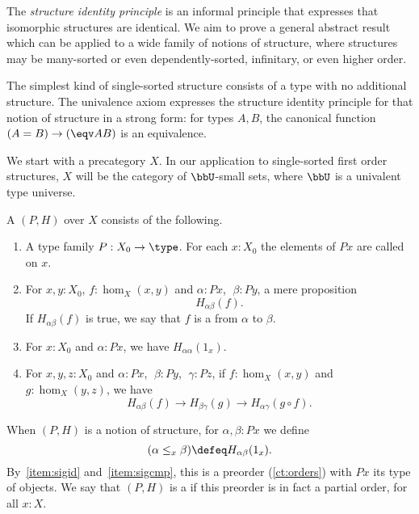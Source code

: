 The \emph{structure identity principle} is an informal principle
that expresses that isomorphic structures are identical.  We aim to
prove a general abstract result which can be applied to a wide family
of notions of structure, where structures may be many-sorted or even
dependently-sorted, infinitary, or even higher order.

The simplest kind of single-sorted structure consists of a type with
no additional structure.  The univalence axiom expresses the structure identity principle for that
notion of structure in a strong form: for types $A,B$, the
canonical function $(A=B)\to (\eqv A B)$ is an equivalence.

We start with a precategory $X$.  In our application to
single-sorted first order structures, $X$ will be the category %
of $\bbU$-small sets, where $\bbU$ is a univalent type universe.

\begin{defn}\label{ct:sig}
  A 
  $(P,H)$ over $X$ consists of the following.
  \begin{enumerate}
  \item A type family $P:X_0 \to \type$.
    For each $x:X_0$ the elements of $Px$ are called 
    on $x$.
  \item For $x,y:X_0$, $f:\hom_X(x,y)$ and $\alpha:Px$, $\;\beta:Py$, a mere proposition
  \[ H_{\alpha\beta}(f).\]
    If $H_{\alpha\beta}(f)$ is true, we say that $f$ is a 
    from $\alpha$ to $\beta$.
  \item For $x:X_0$ and $\alpha:Px$, we have $H_{\alpha\alpha}(1_x)$.\label{item:sigid}
  \item For $x,y,z:X_0$ and $\alpha:Px$, $\;\beta:Py$, $\;\gamma:Pz$,
if $f:\hom_X(x,y)$ and $g:\hom_X(y,z)$, we have\label{item:sigcmp}
  \[ H_{\alpha\beta}(f)\to H_{\beta\gamma}(g)\to H_{\alpha\gamma}(g\circ   f).\]
   \end{enumerate}
  When $(P,H)$ is a notion of structure, for $\alpha,\beta:Px$ we define
  \[ (\alpha\leq_x\beta) \defeq H_{\alpha\beta}(1_x).\]
  By~\ref{item:sigid} and~\ref{item:sigcmp}, this is a preorder (\cref{ct:orders}) with $Px$ its type of objects.
  We say that $(P,H)$ is a 
  if this preorder is in fact a partial order, for all $x:X$.
\end{defn}

